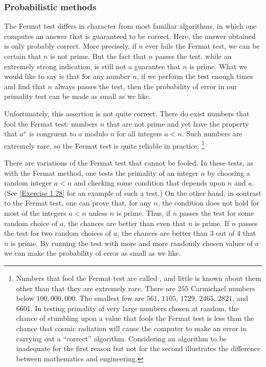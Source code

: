 \subsubsection*{Probabilistic methods}

The Fermat test differs in character from most familiar algorithms, in which one computes an answer that is guaranteed to be correct.
Here, the answer obtained is only probably correct.
More precisely, if \( n \) ever fails the Fermat test, we can be certain that \( n \) is not prime.
But the fact that \( n \) passes the test, while an extremely strong indication, is still not a guarantee that \( n \) is prime.
What we would like to say is that for any number \( n \), if we perform the test enough times and find that \( n \) always passes the test, then the probability of error in our primality test can be made as small as we like.

Unfortunately, this assertion is not quite correct.
There do exist numbers that fool the Fermat test:
numbers \( n \) that are not prime and yet have the property that \( a^n \) is congruent to \( a \) modulo \( n \) for all integers \( a < n \).
Such numbers are extremely rare, so the Fermat test is quite reliable in practice.%
\footnote{
	\label{Footnote 1.47}
	Numbers that fool the Fermat test are called , and little is known about them other than that they are extremely rare.
	There are \( 255 \) Carmichael numbers below \( 100,000,000 \).
	The smallest few are \( 561 \), \( 1105 \), \( 1729 \), \( 2465 \), \( 2821 \), and \( 6601 \).
	In testing primality of very large numbers chosen at random, the chance of stumbling upon a value that fools the Fermat test is less than the chance that cosmic radiation will cause the computer to make an error in carrying out a “correct” algorithm.
	Considering an algorithm to be inadequate for the first reason but not for the second illustrates the difference between mathematics and engineering.
}

There are variations of the Fermat test that cannot be fooled.
In these tests, as with the Fermat method, one tests the primality of an integer \( n \) by choosing a random integer \( a < n \) and checking some condition that depends upon \( n \) and \( a \).
(See \cref{Exercise 1.28} for an example of such a test.)
On the other hand, in contrast to the Fermat test, one can prove that, for any \( n \), the condition does not hold for most of the integers \( a < n \) unless \( n \) is prime.
Thus, if \( n \) passes the test for some random choice of \( a \), the chances are better than even that \( n \) is prime.
If \( n \) passes the test for two random choices of \( a \), the chances are better than \( 3 \) out of \( 4 \) that \( n \) is prime.
By running the test with more and more randomly chosen values of \( a \) we can make the probability of error as small as we like.

